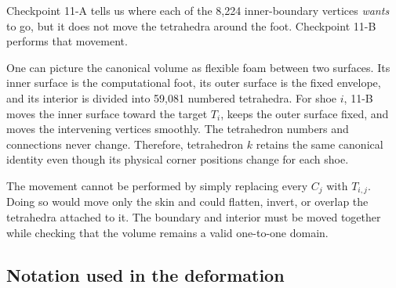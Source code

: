 \documentclass[11pt]{article}
\begin{document}
Checkpoint 11-A tells us where each of the 8,224 inner-boundary vertices \emph{wants} to
go, but it does not move the tetrahedra around the foot. Checkpoint 11-B performs that
movement.

One can picture the canonical volume as flexible foam between two surfaces. Its inner
surface is the computational foot, its outer surface is the fixed envelope, and its
interior is divided into 59,081 numbered tetrahedra. For shoe $i$, 11-B moves the inner
surface toward the target $T_i$, keeps the outer surface fixed, and moves the intervening
vertices smoothly. The tetrahedron numbers and connections never change. Therefore,
tetrahedron $k$ retains the same canonical identity even though its physical corner
positions change for each shoe.

The movement cannot be performed by simply replacing every $C_j$ with $T_{i,j}$. Doing
so would move only the skin and could flatten, invert, or overlap the tetrahedra attached
to it. The boundary and interior must be moved together while checking that the volume
remains a valid one-to-one domain.

\subsection{Notation used in the deformation}
\end{document}
